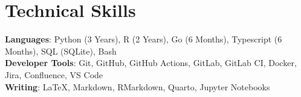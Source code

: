 \section{Technical Skills}

\begin{itemize}[leftmargin=0.15in, label={}]
    \small{\item{
                    \textbf{Languages}{: Python (3 Years), R (2 Years), Go (6 Months), Typescript (6 Months), SQL (SQLite), Bash} \\
                    \textbf{Developer Tools}{: Git, GitHub, GitHub Actions, GitLab, GitLab CI, Docker, Jira, Confluence, VS Code} \\
                    \textbf{Writing}{: LaTeX, Markdown, RMarkdown, Quarto, Jupyter Notebooks}
              }}
\end{itemize}